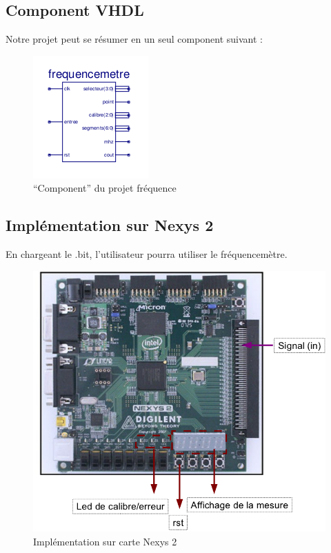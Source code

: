 \documentclass[a4paper,11pt]{article}
\begin{document}
\subsection{Component VHDL}
Notre projet peut se résumer en un seul component suivant :
\begin{figure}[H]
\begin{center}
	\includegraphics[scale=1]{freqa0.png}
	\caption{``Component'' du projet fréquence}
\end{center}
\end{figure}

\subsection{Implémentation sur Nexys 2}
En chargeant le .bit, l'utilisateur pourra utiliser le fréquencemètre.
\begin{figure}[H]
\begin{center}
	\includegraphics[scale=.5]{fpga.png}
	\caption{Implémentation sur carte Nexys 2}
\end{center}
\end{figure}
\end{document}
